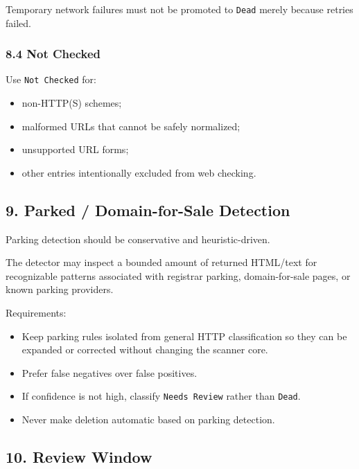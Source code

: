 \documentclass[
  letterpaper,
]{article}
\newcommand{\passthrough}[1]{#1}
\providecommand{\tightlist}{%
  \setlength{\itemsep}{0pt}\setlength{\parskip}{0pt}}
\begin{document}
Temporary network failures must not be promoted to \passthrough{\lstinline!Dead!} merely because retries failed.

\subsubsection{8.4 Not Checked}\label{84-not-checked}

Use \passthrough{\lstinline!Not Checked!} for:

\begin{itemize}
\tightlist
\item
  non-HTTP(S) schemes;
\item
  malformed URLs that cannot be safely normalized;
\item
  unsupported URL forms;
\item
  other entries intentionally excluded from web checking.
\end{itemize}

\subsection{9. Parked / Domain-for-Sale Detection}\label{9-parked--domain-for-sale-detection}

Parking detection should be conservative and heuristic-driven.

The detector may inspect a bounded amount of returned HTML/text for recognizable patterns associated with registrar
parking, domain-for-sale pages, or known parking providers.

Requirements:

\begin{itemize}
\tightlist
\item
  Keep parking rules isolated from general HTTP classification so they can be expanded or corrected without changing the
  scanner core.
\item
  Prefer false negatives over false positives.
\item
  If confidence is not high, classify \passthrough{\lstinline!Needs Review!} rather than \passthrough{\lstinline!Dead!}.
\item
  Never make deletion automatic based on parking detection.
\end{itemize}

\subsection{10. Review Window}\label{10-review-window}
\end{document}
